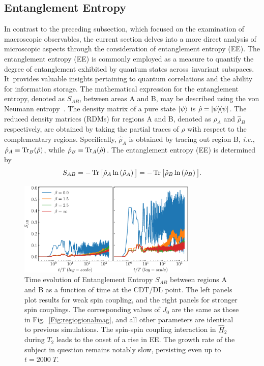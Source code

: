 \documentclass[%
nofootinbib,
reprint,
superscriptaddress,
amsmath,amssymb,showkeys,
aps,
prb,
]{revtex4-2}
\begin{document}
	\subsection{\label{sec:level41} Entanglement Entropy}
In contrast to the preceding subsection, which focused on the examination of macroscopic observables, the current section delves into a more direct analysis of microscopic aspects through the consideration of entanglement entropy (EE). The entanglement entropy (EE) is commonly employed as a measure to quantify the degree of entanglement exhibited by quantum states across invariant subspaces. It provides valuable insights pertaining to quantum correlations and the ability for information storage. The mathematical expression for the entanglement entropy, denoted as $S_{AB}$, between areas A and B, may be described using the von Neumann entropy~\cite{bayat_entanglement_2022,mendes-santos_measuring_2020}.   The density matrix of a pure state $\ket{\psi}$ is $\hat{\rho}= \ketbra{\psi}$. The reduced density matrices (RDMs) for regions A and B, denoted as $\hat{\rho}_A$ and $\hat{\rho}_B$ respectively, are obtained by taking the partial traces of $\hat{\rho}$ with respect to the complementary regions. Specifically, $\hat{\rho}_A$ is obtained by tracing out region B, \textit{i.e.}, $\hat{\rho}_A\equiv \Tr_B(\hat{\rho})$, while $\hat{\rho}_B\equiv\Tr_A(\hat{\rho})$. The entanglement entropy (EE) is determined by
	\begin{equation} 
		S_{AB} = -\Tr\big[\hat{\rho}_A \ln\left(\hat{\rho}_A\right)\big] = -\Tr\big[\hat{\rho}_B \ln\left(\hat{\rho}_B\right)\big].
		\label{eq:vonentrop}
	\end{equation}	
	\begin{figure}
		\begin{center}
			\includegraphics[width=8.5cm]{entangEntrp.pdf}
		\end{center}
		\caption{Time evolution of Entanglement Entropy $S_{AB}$ between regions A and B as a function of time at the CDT/DL point. The left panels plot results for  weak spin coupling, and the right panels for stronger spin couplings. The corresponding values of $J_0$ are the same as those in Fig.~\ref{Fig:regiogionalmag}, and all other parameters are identical to previous simulations. The spin-spin coupling interaction in $\hat{H}_2$ during $T_2$ leads to the onset of a rise in EE. The growth rate of the subject in question remains notably slow, persisting even up to $t=2000\;T$.}
		\label{Fig:entangle}
	\end{figure}
\end{document}
